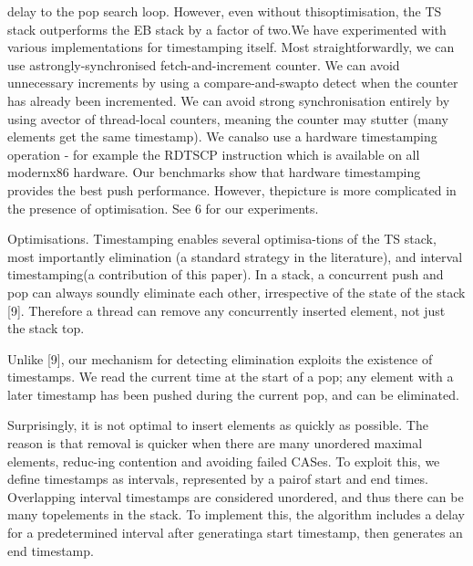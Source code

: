 delay to the pop search loop. However, even without thisoptimisation, the TS stack outperforms the EB stack by a
factor of two.We have experimented with various implementations for
timestamping itself. Most straightforwardly, we can use astrongly-synchronised fetch-and-increment counter. We can
avoid unnecessary increments by using a compare-and-swapto detect when the counter has already been incremented.
We can avoid strong synchronisation entirely by using avector of thread-local counters, meaning the counter may
stutter (many elements get the same timestamp). We canalso use a hardware timestamping operation - for example the RDTSCP instruction which is available on all modernx86 hardware. Our benchmarks show that hardware timestamping provides the best push performance. However, thepicture is more complicated in the presence of optimisation.
See 6 for our experiments.

Optimisations. 
Timestamping enables several optimisa-tions of the TS stack, most importantly
elimination (a standard strategy in the literature), and interval
timestamping(a contribution of this paper).
In a stack, a concurrent push and pop can always soundly eliminate each other,
irrespective of the state of the stack [9].
Therefore a thread can remove any concurrently inserted element, not just the
stack top. 

Unlike [9], our mechanism for detecting elimination exploits the existence of
timestamps. 
We read the current time at the start of a pop; any element with a
later timestamp has been pushed during the current pop, and can be eliminated.

Surprisingly, it is not optimal to insert elements as quickly as possible. 
The reason is that removal is quicker when there are many unordered maximal
elements, reduc-ing contention and avoiding failed CASes. 
To exploit this, we define timestamps as intervals, represented by a pairof
start and end times. Overlapping interval timestamps are considered unordered,
and thus there can be many topelements in the stack. To implement this, the
algorithm includes a delay for a predetermined interval after generatinga start
timestamp, then generates an end timestamp.

